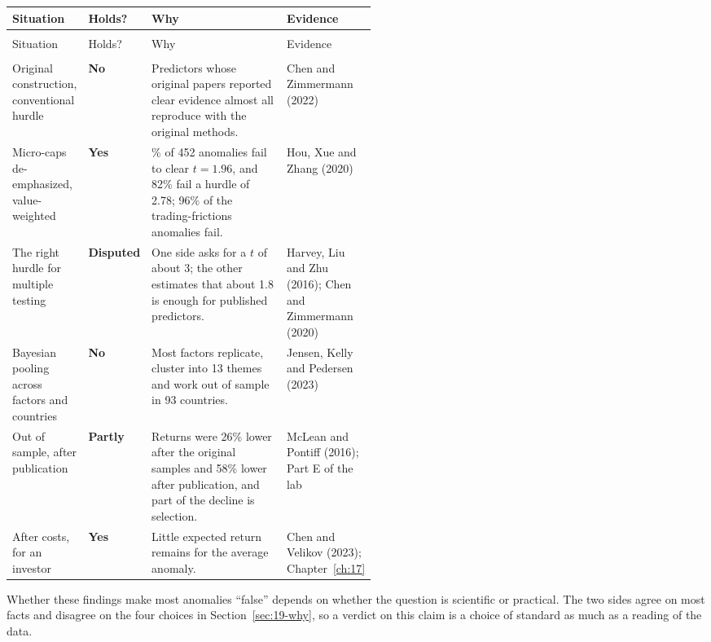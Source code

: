 {\small
\begin{longtable}{@{}>{\raggedright\arraybackslash}p{0.19\linewidth}>{\raggedright\arraybackslash}p{0.10\linewidth}>{\raggedright\arraybackslash}p{}>{\raggedright\arraybackslash}p{0.23\linewidth}@{}}
\toprule
Situation & Holds? & Why & Evidence \\
\midrule
\endfirsthead
\multicolumn{4}{@{}l}{\emph{(continued)}} \\
\toprule
Situation & Holds? & Why & Evidence \\
\midrule
\endhead
\midrule
\multicolumn{4}{r@{}}{\emph{(continued on the next page)}} \\
\endfoot
\bottomrule
\endlastfoot
Original construction, conventional hurdle & \textbf{No} & Predictors whose original papers reported clear evidence almost all reproduce with the original methods. & Chen and Zimmermann (2022) \\
\addlinespace[3pt]
Micro-caps de-emphasized, value-weighted & \textbf{Yes} & 65\% of 452 anomalies fail to clear $t = 1.96$, and 82\% fail a hurdle of 2.78; 96\% of the trading-frictions anomalies fail. & Hou, Xue and Zhang (2020) \\
\addlinespace[3pt]
The right hurdle for multiple testing & \textbf{Disputed} & One side asks for a $t$ of about 3; the other estimates that about 1.8 is enough for published predictors. & Harvey, Liu and Zhu (2016); Chen and Zimmermann (2020) \\
\addlinespace[3pt]
Bayesian pooling across factors and countries & \textbf{No} & Most factors replicate, cluster into 13 themes and work out of sample in 93 countries. & Jensen, Kelly and Pedersen (2023) \\
\addlinespace[3pt]
Out of sample, after publication & \textbf{Partly} & Returns were 26\% lower after the original samples and 58\% lower after publication, and part of the decline is selection. & McLean and Pontiff (2016); Part E of the lab \\
\addlinespace[3pt]
After costs, for an investor & \textbf{Yes} & Little expected return remains for the average anomaly. & Chen and Velikov (2023); Chapter~\ref{ch:17} \\
\end{longtable}
}

Whether these findings make most anomalies ``false'' depends on whether the question is scientific or practical. The two sides agree on most facts and disagree on the four choices in Section~\ref{sec:19-why}, so a verdict on this claim is a choice of standard as much as a reading of the data.

